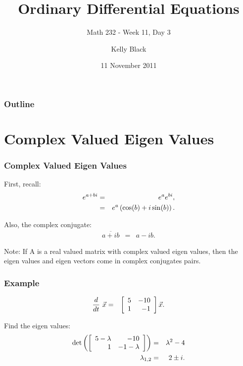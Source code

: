 
\title{Ordinary Differential Equations}
\subtitle{Math 232 - Week 11, Day 3}

\author{Kelly Black}
\date{11 November 2011}

\begin{frame}
  \titlepage
\end{frame}

\begin{frame}
  \frametitle{Outline}
\end{frame}


\section{Complex Valued Eigen Values}


\begin{frame}
  \frametitle{Complex Valued Eigen Values}

  First, recall:
  \begin{eqnarray*}
    e^{a+bi} & = & e^a e^{bi}, \\
    & = & e^a \lp \cos(b) + i \sin(b) \rp.
  \end{eqnarray*}

  Also, the complex conjugate:
  \begin{eqnarray*}
    \overline{a+ib} & = & a-i b.
  \end{eqnarray*}

  Note: If A is a real valued matrix with complex valued eigen values,
  then the eigen values and eigen vectors come in complex conjugates
  pairs.

\end{frame}


\begin{frame}
  \frametitle{Example}

  \begin{eqnarray*}
    \deriv{~}{t} \vec{x} & = & \arrayTwo{5}{-10}{1}{-1} \vec{x}.
  \end{eqnarray*}

  {
    Find the eigen values:
    \begin{eqnarray*}
      \det\lp\arrayTwo{5-\lambda}{-10}{1}{-1-\lambda}\rp & = & \lambda^2-4 \\
      \lambda_{1,2} & = & 2 \pm i.
    \end{eqnarray*}
  }

\end{frame}


